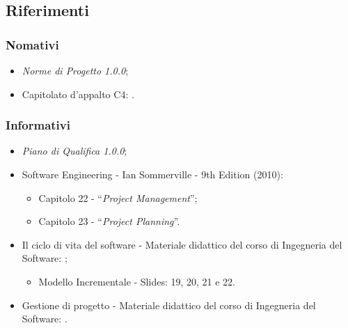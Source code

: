 \subsection{Riferimenti}
\subsubsection{Nomativi}
\begin{itemize}
    \item \textit{Norme di Progetto 1.0.0};
    \item Capitolato\glo{} d'appalto C4: \newline {}.
\end{itemize}

\subsubsection{Informativi}
\begin{itemize}
    \item \textit{Piano di Qualifica 1.0.0};
    \item Software Engineering - Ian Sommerville - 9th Edition (2010):
        \begin{itemize}
            \item Capitolo 22 - “\textit{Project Management}”;
            \item Capitolo 23 - “\textit{Project Planning}”.
        \end{itemize}
    \item Il ciclo di vita del software - Materiale didattico del corso di Ingegneria del Software: \newline {};
        \begin{itemize}
            \item Modello Incrementale - Slides: 19, 20, 21 e 22.
        \end{itemize}
    \item Gestione di progetto - Materiale didattico del corso di Ingegneria del Software: \newline {}.
\end{itemize}



